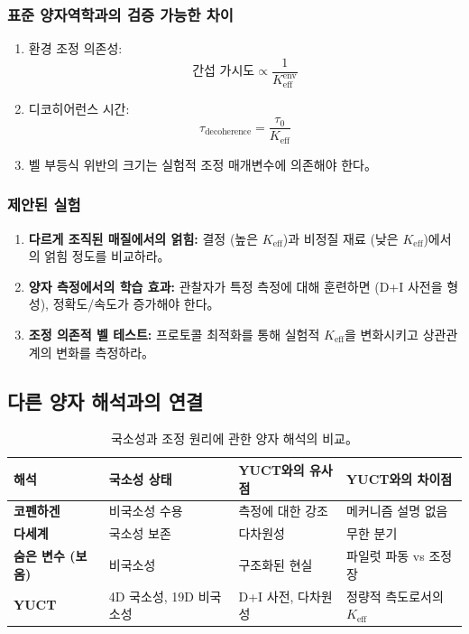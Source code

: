 \documentclass[11pt,a4paper]{article}
\begin{document}
\subsubsection{표준 양자역학과의 검증 가능한 차이}
\begin{enumerate}
\item 환경 조정 의존성:
\begin{equation}
	\text{간섭 가시도} \propto \frac{1}{K_{\mathrm{eff}}^{\text{env}}}
\end{equation}

\item 디코히어런스 시간:
\begin{equation}
	\tau_{\text{decoherence}} = \frac{\tau_0}{K_{\mathrm{eff}}}
\end{equation}

\item 벨 부등식 위반의 크기는 실험적 조정 매개변수에 의존해야 한다。
\end{enumerate}

\subsubsection{제안된 실험}
\begin{enumerate}
\item \textbf{다르게 조직된 매질에서의 얽힘:} 결정 (높은 $K_{\mathrm{eff}}$)과 비정질 재료 (낮은 $K_{\mathrm{eff}}$)에서의 얽힘 정도를 비교하라。

\item \textbf{양자 측정에서의 학습 효과:} 관찰자가 특정 측정에 대해 훈련하면 (D+I 사전을 형성), 정확도/속도가 증가해야 한다。

\item \textbf{조정 의존적 벨 테스트:} 프로토콜 최적화를 통해 실험적 $K_{\mathrm{eff}}$을 변화시키고 상관관계의 변화를 측정하라。
\end{enumerate}

\subsection{다른 양자 해석과의 연결}
\label{subsec:interpretations}

\begin{table}[htbp]
\centering
\begin{tabular}{p{}p{}p{}p{}}
	\toprule
	\textbf{해석} & \textbf{국소성 상태} & \textbf{YUCT와의 유사점} & \textbf{YUCT와의 차이점} \\
	\midrule
	\textbf{코펜하겐} & 비국소성 수용 & 측정에 대한 강조 & 메커니즘 설명 없음 \\
	\textbf{다세계} & 국소성 보존 & 다차원성 & 무한 분기 \\
	\textbf{숨은 변수 (보옴)} & 비국소성 & 구조화된 현실 & 파일럿 파동 vs 조정 장 \\
	\textbf{YUCT} & 4D 국소성, 19D 비국소성 & D+I 사전, 다차원성 & 정량적 측도로서의 $K_{\mathrm{eff}}$ \\
	\bottomrule
\end{tabular}
\caption{국소성과 조정 원리에 관한 양자 해석의 비교。}
\label{tab:interpretations}
\end{table}
\end{document}
